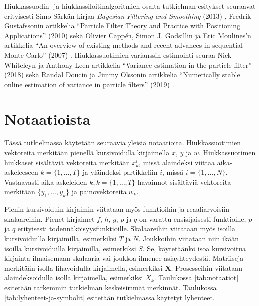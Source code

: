 \documentclass[
  12pt,
  a4paper, twoside]{book}
\begin{document}
Hiukkassuodin- ja hiukkassiloitinalgoritmien osalta tutkielman esitykset seuraavat erityisesti Simo Särkän kirjaa \textit{Bayesian Filtering and Smoothing} (2013) \citep{sarkka-2013}, Fredrik Gustafssonin artikkelia ``Particle Filter Theory and Practice with Positioning Applications'' (2010) \citep{gustafsson-2010} sekä Olivier Cappén, Simon J. Godsillin ja Eric Moulines'n artikkelia ``An overview of existing methods and recent advances in sequential Monte Carlo'' (2007) \citep{cappe-2007}. Hiukkassuotimien varianssin estimointi seuraa Nick Whiteleyn ja Anthony Leen artikkelia ``Variance estimation in the particle filter'' (2018) \citep{Lee-2018} sekä Randal Doucin ja Jimmy Olssonin artikkelia ``Numerically stable online estimation of variance in particle filters'' (2019) \citep{olsson-2019}.

\section{Notaatioista}

Tässä tutkielmassa käytetään seuraavia yleisiä notaatioita. Hiukkassuotimien vektoreita merkitään pienellä kursivoidulla kirjaimella \(x\), \(y\) ja \(w\). Hiukkassuotimen hiukkaset sisältäviä vektoreita merkitään \(x_k^i\), missä alaindeksi viittaa aika-askeleeseen \(k=\{1,\ldots,T\}\) ja yläindeksi partikkeliin \(i\), missä \(i=\{1,\ldots,N\}\). Vastaavasti aika-askeleiden \(k, k=\{1,\ldots,T\}\) havainnot sisältäviä vektoreita merkitään \(\{y_1,\ldots,y_k\}\) ja painovektoreita \(w_k\).

Pienin kursivoiduin kirjaimin viitataan myös funktioihin ja reaaliarvoisiin skalaareihin. Pienet kirjaimet \(f\), \(h\), \(g\), \(p\) ja \(q\) on varattu ensisijaisesti funktioille, \(p\) ja \(q\) erityisesti todennäköisyysfunktioille. Skalaareihin viitataan myös isoilla kursivoiduilla kirjaimilla, esimerkiksi \(T\) ja \(N\). Joukkoihin viitataan niin ikään isoilla kursivoiduilla kirjaimilla, esimerkiksi \(S\). Se, käytetäänkö isoa kursivoitua kirjainta ilmaisemaan skalaaria vai joukkoa ilmenee asiayhteydestä. Matriiseja merkitään isolla lihavoidulla kirjaimella, esimerkiksi \(\mathbf{X}\). Prosesseihin viitataan alaindeksoidulla isolla kirjaimella, esimerkiksi \(X_k\). Taulukossa \ref{tab:notaatiot} esitetään tarkemmin tutkielman keskeisimmät merkinnät. Taulukossa \ref{tab:lyhenteet-ja-symbolit} esitetään tutkielmassa käytetyt lyhenteet.
\end{document}

